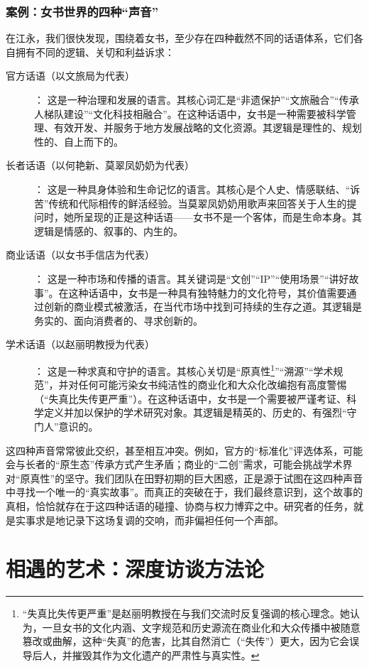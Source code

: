 \documentclass[UTF8]{ctexart}
\begin{document}
\subsubsection{案例：女书世界的四种“声音”}
在江永，我们很快发现，围绕着女书，至少存在四种截然不同的话语体系，它们各自拥有不同的逻辑、关切和利益诉求：
\begin{description}
    \item[官方话语（以文旅局为代表）]： 这是一种治理和发展的语言。其核心词汇是“非遗保护”“文旅融合”“传承人梯队建设”“文化科技相融合”。在这种话语中，女书是一种需要被科学管理、有效开发、并服务于地方发展战略的文化资源。其逻辑是理性的、规划性的、自上而下的。
    \item[长者话语（以何艳新、莫翠凤奶奶为代表）]： 这是一种具身体验和生命记忆的语言。其核心是个人史、情感联结、“诉苦”传统和代际相传的鲜活经验。当莫翠凤奶奶用歌声来回答关于人生的提问时，她所呈现的正是这种话语——女书不是一个客体，而是生命本身。其逻辑是情感的、叙事的、内生的。
    \item[商业话语（以女书手信店为代表）]： 这是一种市场和传播的语言。其关键词是“文创”“IP”“使用场景”“讲好故事”。在这种话语中，女书是一种具有独特魅力的文化符号，其价值需要通过创新的商业模式被激活，在当代市场中找到可持续的生存之道。其逻辑是务实的、面向消费者的、寻求创新的。
    \item[学术话语（以赵丽明教授为代表）]： 这是一种求真和守护的语言。其核心关切是“原真性\footnote[2]{“失真比失传更严重”是赵丽明教授在与我们交流时反复强调的核心理念。她认为，一旦女书的文化内涵、文字规范和历史源流在商业化和大众传播中被随意篡改或曲解，这种“失真”的危害，比其自然消亡（“失传”）更大，因为它会误导后人，并摧毁其作为文化遗产的严肃性与真实性。}”“溯源”“学术规范”，并对任何可能污染女书纯洁性的商业化和大众化改编抱有高度警惕（“失真比失传更严重”）。在这种话语中，女书是一个需要被严谨考证、科学定义并加以保护的学术研究对象。其逻辑是精英的、历史的、有强烈“守门人”意识的。
\end{description}
这四种声音常常彼此交织，甚至相互冲突。例如，官方的“标准化”评选体系，可能会与长者的“原生态”传承方式产生矛盾；商业的“二创”需求，可能会挑战学术界对“原真性”的坚守。我们团队在田野初期的巨大困惑，正是源于试图在这四种声音中寻找一个唯一的“真实故事”。而真正的突破在于，我们最终意识到，这个故事的真相，恰恰就存在于这四种话语的碰撞、协商与权力博弈之中。研究者的任务，就是实事求是地记录下这场复调的交响，而非偏袒任何一个声部。

\newpage

\section{相遇的艺术：深度访谈方法论}
\end{document}
